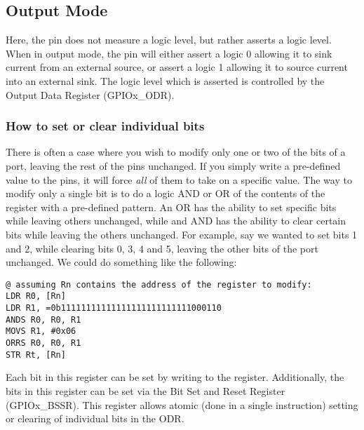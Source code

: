 \subsection{Output Mode}
Here, the pin does not measure a logic level, but rather asserts a logic level. When in output mode, the pin will either assert a logic 0 allowing it to sink current from an external source, or assert a logic 1 allowing it to source current into an external sink. The logic level which is asserted is controlled by the Output Data Register (GPIOx\_ODR). 

\subsubsection{How to set or clear individual bits}
There is often a case where you wish to modify only one or two of the bits of a port, leaving the rest of the pins unchanged. If you simply write a pre-defined value to the pins, it will force \emph{all} of them to take on a specific value. The way to modify only a single bit is to do a logic AND or OR of the contents of the register with a pre-defined pattern. An OR has the ability to set specific bits while leaving others unchanged, while and AND has the ability to clear certain bits while leaving the others unchanged. For example, say we wanted to set bits 1 and 2, while clearing bits 0, 3, 4 and 5, leaving the other bits of the port unchanged. We could do something like the following:
\begin{lstlisting}[fontadjust=true,frame=trBL]
@ assuming Rn contains the address of the register to modify:
LDR R0, [Rn]    
LDR R1, =0b11111111111111111111111111000110
ANDS R0, R0, R1
MOVS R1, #0x06
ORRS R0, R0, R1
STR Rt, [Rn]
\end{lstlisting}


Each bit in this register can be set by writing to the register. Additionally, the bits in this register can be set via the Bit Set and Reset Register (GPIOx\_BSSR). This register allows atomic (done in a single instruction) setting or clearing of individual bits in the ODR. 
